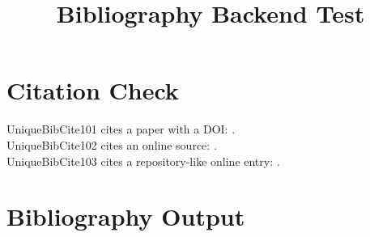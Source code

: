 \documentclass{SUSTechHomework}
\title{Bibliography Backend Test}
\begin{document}
\maketitle
\tableofcontents

\section{Citation Check}

UniqueBibCite101 cites a paper with a DOI: \textcite{shannon1948test}.\\
UniqueBibCite102 cites an online source: \parencite{ctanbiblatextest}.\\
UniqueBibCite103 cites a repository-like online entry: \parencite{pygmentstest}.

\section{Bibliography Output}

\sustechprintbibliography
\end{document}
